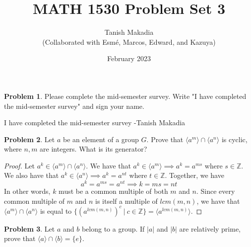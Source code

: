 \documentclass[12pt,reqno]{article}
\title{MATH 1530 Problem Set 3}
\author{Tanish Makadia\\\small{(Collaborated with Esmé, Marcos, Edward, and Kazuya)}}
\date{February 2023}
\newcommand{\Z}{\mathbb{Z}}
\theoremstyle{plain}
\theoremstyle{definition}
\newtheorem{problem}{Problem}
\begin{document}
\maketitle


\begin{problem}
    Please complete the mid-semester survey. Write "I have completed the mid-semester survey" and sign your name.
\end{problem}

I have completed the mid-semester survey -Tanish Makadia

\newpage


\begin{problem}
    Let \(a\) be an element of a group \(G\). Prove that \(\langle a^m\rangle \cap \langle a^n\rangle\)
    is cyclic, where \(n,m\) are integers. What is its generator?
\end{problem}

\begin{proof}
    Let \(a^k\in \langle a^m\rangle \cap \langle a^n\rangle\). We have that \(a^{k}\in\langle a^m\rangle\implies a^k=a^{ms}\) where \(s\in\Z\). 
    We also have that \(a^k\in\langle a^n\rangle\implies a^k=a^{nt}\) where \(t\in\Z\). Together, we have
    \[a^k=a^{ms}=a^{nt}\implies k=ms=nt\]
    In other words, \(k\) must be a common multiple of both \(m\) and \(n\). Since every common multiple of \(m\) and
    \(n\) is itself a multiple of \(lcm(m,n)\), we have that \(\langle a^m\rangle \cap \langle a^n\rangle\) is equal to 
    \(\{(a^{lcm(m,n)})^c\ |\ c\in\Z\}=\langle a^{lcm(m,n)}\rangle\). 
\end{proof}

\newpage


\begin{problem}
    Let \(a\) and \(b\) belong to a group. If \(|a|\) and \(|b|\) are relatively prime, prove that \(\langle a\rangle \cap \langle b\rangle = \{e\}\).
\end{problem}
\end{document}
